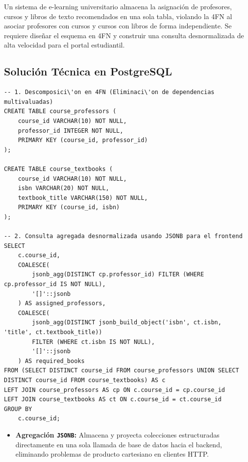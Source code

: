 \begin{businessproblem}
Un sistema de e-learning universitario almacena la asignaci\'on de profesores, cursos y libros de texto recomendados en una sola tabla, violando la 4FN al asociar profesores con cursos y cursos con libros de forma independiente. Se requiere dise\~nar el esquema en 4FN y construir una consulta desnormalizada de alta velocidad para el portal estudiantil.
\end{businessproblem}

\subsection{Soluci\'on T\'ecnica en PostgreSQL}

\begin{lstlisting}[style=sqlstyle, caption={Descomposici\'on en 4FN y consulta consolidada}]
-- 1. Descomposici\'on en 4FN (Eliminaci\'on de dependencias multivaluadas)
CREATE TABLE course_professors (
    course_id VARCHAR(10) NOT NULL,
    professor_id INTEGER NOT NULL,
    PRIMARY KEY (course_id, professor_id)
);

CREATE TABLE course_textbooks (
    course_id VARCHAR(10) NOT NULL,
    isbn VARCHAR(20) NOT NULL,
    textbook_title VARCHAR(150) NOT NULL,
    PRIMARY KEY (course_id, isbn)
);

-- 2. Consulta agregada desnormalizada usando JSONB para el frontend
SELECT
    c.course_id,
    COALESCE(
        jsonb_agg(DISTINCT cp.professor_id) FILTER (WHERE cp.professor_id IS NOT NULL),
        '[]'::jsonb
    ) AS assigned_professors,
    COALESCE(
        jsonb_agg(DISTINCT jsonb_build_object('isbn', ct.isbn, 'title', ct.textbook_title))
        FILTER (WHERE ct.isbn IS NOT NULL),
        '[]'::jsonb
    ) AS required_books
FROM (SELECT DISTINCT course_id FROM course_professors UNION SELECT DISTINCT course_id FROM course_textbooks) AS c
LEFT JOIN course_professors AS cp ON c.course_id = cp.course_id
LEFT JOIN course_textbooks AS ct ON c.course_id = ct.course_id
GROUP BY
    c.course_id;
\end{lstlisting}

\begin{engtip}
\begin{itemize}
    \item \textbf{Agregaci\'on \texttt{JSONB}:} Almacena y proyecta colecciones estructuradas directamente en una sola llamada de base de datos hacia el backend, eliminando problemas de producto cartesiano en clientes HTTP.
\end{itemize}
\end{engtip}
